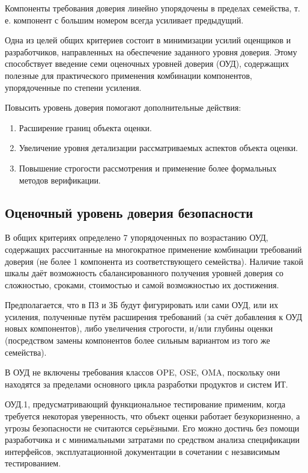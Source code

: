 \documentclass[12pt, russian, oneside, article]{ncc}
\begin{document}
Компоненты требования доверия линейно упорядочены в пределах семейства, т. е. компонент с большим номером всегда усиливает предыдущий.

Одна из целей общих критериев состоит в минимизации усилий оценщиков и разработчиков, направленных на обеспечение заданного уровня доверия. Этому способствует введение семи оценочных уровней доверия (ОУД), содержащих полезные для практического применения комбинации компонентов, упорядоченные по степени усиления.

Повысить уровень доверия помогают дополнительные действия:
\begin{enumerate}
\item Расширение границ объекта оценки.
\item Увеличение уровня детализации рассматриваемых аспектов объекта оценки.
\item Повышение строгости рассмотрения и применение более формальных методов верификации.
\end{enumerate}
\subsection{Оценочный уровень доверия безопасности}
\label{sec-3_4}


В общих критериях определено 7 упорядоченных по возрастанию ОУД, содержащих рассчитанные на многократное применение комбинации требований доверия (не более 1 компонента из соответствующего семейства). Наличие такой шкалы даёт возможность сбалансированного получения уровней доверия со сложностью, сроками, стоимостью и самой возможностью их достижения.

Предполагается, что в ПЗ и ЗБ будут фигурировать или сами ОУД, или их усиления, полученные путём расширения требований (за счёт добавления к ОУД новых компонентов), либо увеличения строгости, и/или глубины оценки (посредством замены компонентов более сильным вариантом из того же семейства).

В ОУД не включены требования классов OPE, OSE, OMA, поскольку они находятся за пределами основного цикла разработки продуктов и систем ИТ.

ОУД.1, предусматривающий функциональное тестирование применим, когда требуется некоторая уверенность, что объект оценки работает безукоризненно, а угрозы безопасности не считаются серьёзными. Его можно достичь без помощи разработчика и с минимальными затратами по средством анализа спецификации интерфейсов, эксплуатационной документации в сочетании с независимым тестированием.
\end{document}
